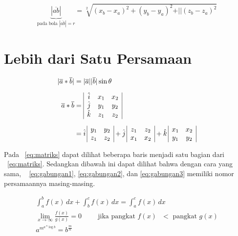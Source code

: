 \noindent \begin{align}\label{eq:bola}
	\underbrace{|\overline{ab}|}_{\text{pada bola $|\overline{ab}| = r$}} 
		= \sqrt[2]{(x_{b} - x_{a})^{2} + (y_{b} - y_{a})^{2} + 
				\vert\vert(z_{b} - z_{a})^{2}}
\end{align}

\section{Lebih dari Satu Persamaan}
\label{sec:multiEqu}
\noindent \begin{align}\label{eq:matriks}	
	|\overline{a} * \overline{b}| &= |\overline{a}| |\overline{b}| \sin\theta 
		\\[0.2cm]
	\overline{a} * \overline{b} &=  
		\begin{array}{| c c c |}
			\hat{i} & x_{1} & x_{2} \\
			\hat{j} & y_{1} & y_{2} \\
			\hat{k} & z_{1} & z_{2} \\
		\end{array} \nonumber \\[0.2cm]
	&= \hat{i} \,
		\begin{array}{ | c c | }
			y_{1} & y_{2} \\
			z_{1} & z_{2} \\
		\end{array} 
	   + \hat{j} \,
		\begin{array}{ | c c | }
			z_{1} & z_{2} \\
			x_{1} & x_{2} \\
		\end{array} 
	   + \hat{k} \,	
		\begin{array}{ | c c | }
			x_{1} & x_{2} \\
			y_{1} & y_{2} \\
		\end{array}
		\nonumber
\end{align}

Pada \equ~\ref{eq:matriks} dapat dilihat beberapa baris menjadi satu bagian 
dari \equ~\ref{eq:matriks}. 
Sedangkan dibawah ini dapat dilihat bahwa dengan cara yang sama, \equ~
\ref{eq:gabungan1}, \ref{eq:gabungan2}, dan \ref{eq:gabungan3} memiliki nomor 
persamaannya masing-masing. 

\noindent \begin{align}\label{eq:gabungan1}	
	\int_{a}^{b} f(x)\, dx + \int_{b}^{c} f(x) \, dx = \int_{a}^{c} f(x) \, dx
		\\\label{eq:gabungan2}
	\lim_{x \to \infty} \frac{f(x)}{g(x)} = 0 \hspace{1cm} 
		\text{jika pangkat $f(x)$ $<$ pangkat $g(x)$} \\\label{eq:gabungan3}
	a^{m^{a \, ^{n}\log b }} = b^{\frac{m}{n}}
\end{align}
\fi
